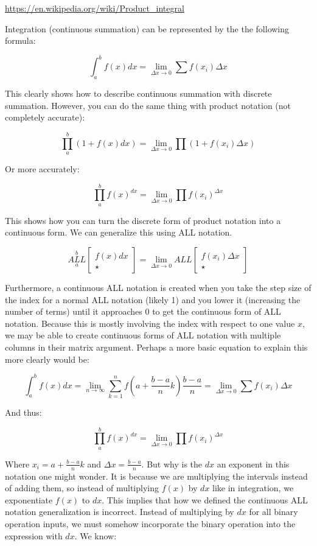 \documentclass{article}
\begin{document}
\url{https://en.wikipedia.org/wiki/Product_integral}

Integration (continuous summation) can be represented by the the following formula:

$$\int_a^b f(x) dx = \underset{\Delta x \rightarrow 0}{\lim} \sum f(x_i) \Delta x$$

This clearly shows how to describe continuous summation with discrete summation. However, you can do the same thing with product notation (not completely accurate):

$$\prod_a^b(1+f(x) dx) =  \underset{\Delta x \rightarrow 0}{\lim} \prod (1 + f(x_i) \Delta x)$$

Or more accurately:

$$\prod_a^bf(x)^{dx} =  \underset{\Delta x \rightarrow 0}{\lim} \prod f(x_i)^{\Delta x}$$

This shows how you can turn the discrete form of product notation into a continuous form. We can generalize this using ALL notation.

$$\underset{a}{\overset{b}{ALL}} \begin{bmatrix}
f(x)dx \\
\star
\end{bmatrix}=\underset{\Delta x \rightarrow 0}{\lim} ALL \begin{bmatrix}
f(x_i)\Delta x \\
\star
\end{bmatrix}$$

Furthermore, a continuous ALL notation is created when you take the step size of the index for a normal ALL notation (likely 1) and you lower it (increasing the number of terms) until it approaches 0 to get the continuous form of ALL notation. Because this is mostly involving the index with respect to one value $x$, we may be able to create continuous forms of ALL notation with multiple columns in their matrix argument. Perhaps a more basic equation to explain this more clearly would be:

$$\int_a^b f(x) dx = \underset{n \rightarrow \infty}{\lim} \sum_{k=1}^{n} f(a+\frac{b-a}{n}k)\frac{b-a}{n}=\underset{\Delta x \rightarrow 0}{\lim} \sum f(x_i) \Delta x$$

And thus:

$$\prod_a^bf(x)^{dx} =  \underset{\Delta x \rightarrow 0}{\lim} \prod f(x_i)^{\Delta x}$$

Where $x_i = a+\frac{b-a}{n}k$ and $\Delta x = \frac{b-a}{n}$. But why is the $dx$ an exponent in this notation one might wonder. It is because we are multiplying the intervals instead of adding them, so instead of multiplying $f(x)$ by $dx$ like in integration, we exponentiate $f(x)$ to $dx$. This implies that how we defined the continuous ALL notation generalization is incorrect. Instead of multiplying by $dx$ for all binary operation inputs, we must somehow incorporate the binary operation into the expression with $dx$. We know:
\end{document}
